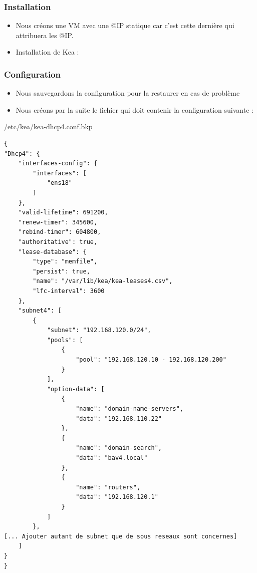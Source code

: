 \documentclass{article}
\begin{document}
\subsubsection{Installation}
\begin{itemize}
    \item Nous créons une VM avec une @IP statique car c’est cette dernière qui attribuera les @IP.
    \item Installation de Kea : 
\end{itemize}

\subsubsection{Configuration}
\begin{itemize}
    \item Nous sauvegardons la configuration pour la restaurer en cas de problème 
    \item Nous créons par la suite le fichier  qui doit contenir la configuration suivante :
\end{itemize}
    \newpage
\begin{configbox}{/etc/kea/kea-dhcp4.conf.bkp}
    \begin{lstlisting}
{
"Dhcp4": {
	"interfaces-config": {
		"interfaces": [
			"ens18"
		]
	},
	"valid-lifetime": 691200,
	"renew-timer": 345600,
	"rebind-timer": 604800,
	"authoritative": true,
	"lease-database": {
		"type": "memfile",
		"persist": true,
		"name": "/var/lib/kea/kea-leases4.csv",
		"lfc-interval": 3600
	},
	"subnet4": [
		{
			"subnet": "192.168.120.0/24",
			"pools": [
				{
					"pool": "192.168.120.10 - 192.168.120.200"
				}
			],
			"option-data": [
				{
					"name": "domain-name-servers",
					"data": "192.168.110.22"
				},
				{
					"name": "domain-search",
					"data": "bav4.local"
				},
				{
					"name": "routers",
					"data": "192.168.120.1"
				}
			]
		},
[... Ajouter autant de subnet que de sous reseaux sont concernes]
	]
}
}
    \end{lstlisting}
\end{configbox}
\end{document}
